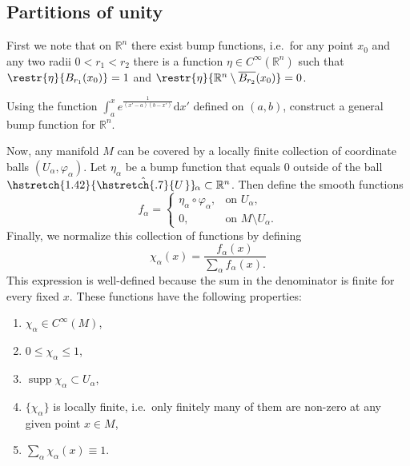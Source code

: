 \documentclass[english,letterpaper]{article}%
\numberwithin{equation}{section}
\numberwithin{figure}{section}
\numberwithin{table}{section}
\theoremstyle{definition}
\theoremstyle{definition}
\theoremstyle{definition}
\theoremstyle{plain}
\theoremstyle{plain}
\theoremstyle{plain}
\theoremstyle{plain}
\theoremstyle{remark}
\theoremstyle{remark}
\newcommand{\dd}{{\mathrm{d}}}
\renewcommand{\leq}{\leqslant}
\DeclareMathOperator{\supp}{supp}
\newcommand\wh[1]{\hstretch{1.42}{\hat{\hstretch{.7}{#1\mkern2mu}}}\mkern-2mu} %
\begin{document}
\subsection{Partitions of unity}

First we note that on $\mathbb{R}^n$ there exist bump functions, i.e.\ for any point $x_0$ and any two radii $0<r_1<r_2$ there is a function $\eta\in C^\infty(\mathbb{R}^n)$ such that $\restr{\eta}{B_{r_1}(x_0)}=1$ and $\restr{\eta}{\mathbb{R}^n\setminus \overline{B_{r_2}}(x_0)}=0$.
\begin{xca}
Using the function $\int_a^x e^{\frac{1}{(x'-a)(b-x')}} \dd x'$ defined on $(a,b)$, construct a general bump function for $\mathbb{R}^n$.
\end{xca}

Now, any manifold $M$ can be covered by a locally finite collection of coordinate balls $(U_\alpha,\varphi_\alpha)$. Let $\eta_\alpha$ be a bump function that equals $0$ outside of the ball $\wh{U}_\alpha\subset \mathbb{R}^n$. Then define the smooth functions
\[f_\alpha =\begin{cases} \eta_\alpha\circ\varphi_\alpha, & \text{on }U_\alpha, \\ 0, & \text{on }M\setminus U_\alpha.\end{cases}\]
Finally, we normalize this collection of functions by defining
\[\chi_\alpha(x)=\frac{f_\alpha(x)}{\sum_\alpha f_\alpha (x).}\]
This expression is well-defined because the sum in the denominator is finite for every fixed $x$. These functions have the following properties:
\begin{enumerate}
    \item $\chi_\alpha\in C^\infty(M)$,
    \item $0\leq \chi_\alpha\leq 1$,
    \item $\supp \chi_\alpha\subset U_\alpha$,
    \item $\{\chi_\alpha\}$ is locally finite, i.e.\ only finitely many of them are non-zero at any given point $x\in M$,
    \item $\sum_\alpha \chi_\alpha (x)\equiv 1$.
\end{enumerate}
\end{document}
